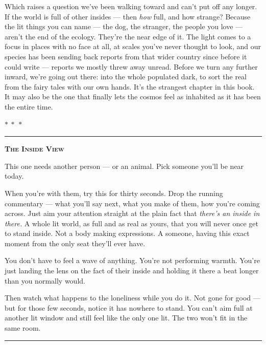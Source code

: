 \documentclass[11pt,openany]{book}
\begin{document}
Which raises a question we’ve been walking toward and can’t put off any longer. If the world is full of other insides — then \textit{how} full, and how strange? Because the lit things you can name — the dog, the stranger, the people you love — aren’t the end of the ecology. They’re the near edge of it. The light comes to a focus in places with no face at all, at scales you’ve never thought to look, and our species has been sending back reports from that wider country since before it could write — reports we mostly threw away unread. Before we turn any further inward, we’re going out there: into the whole populated dark, to sort the real from the fairy tales with our own hands. It’s the strangest chapter in this book. It may also be the one that finally lets the cosmos feel as inhabited as it has been the entire time.


\medskip\begin{center}\textcolor{rule}{$\ast\ \ast\ \ast$}\end{center}\medskip


\bigskip
{\par\noindent\color{rule}\rule{\linewidth}{0.8pt}}\par\smallskip
{\centering\scshape\bfseries The Inside View\par}\smallskip
\begingroup\setlength{\parindent}{0pt}\setlength{\parskip}{0.6em}
This one needs another person — or an animal. Pick someone you’ll be near today.

When you’re with them, try this for thirty seconds. Drop the running commentary — what you’ll say next, what you make of them, how you’re coming across. Just aim your attention straight at the plain fact that \textit{there’s an inside in there.} A whole lit world, as full and as real as yours, that you will never once get to stand inside. Not a body making expressions. A someone, having this exact moment from the only seat they’ll ever have.

You don’t have to feel a wave of anything. You’re not performing warmth. You’re just landing the lens on the fact of their inside and holding it there a beat longer than you normally would.

Then watch what happens to the loneliness while you do it. Not gone for good — but for those few seconds, notice it has nowhere to stand. You can’t aim full at another lit window and still feel like the only one lit. The two won’t fit in the same room.
\endgroup\par\smallskip
{\noindent\color{rule}\rule{\linewidth}{0.8pt}}
\bigskip
\end{document}
